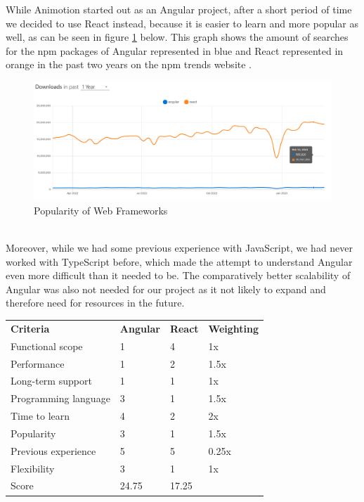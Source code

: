 While Animotion started out as an Angular project, after a short period of time we decided to use React instead, because it 
is easier to learn and more popular as well, as can be seen in figure \ref{fig:webpop} below. This graph shows the amount of 
searches for the npm packages of Angular represented in blue and React represented in orange in the past two years on
the npm trends website \cite{AngularReactPopularity}.
\\
\begin{figure}[htb]
  \centering
  \includegraphics[width=1\textwidth]{pics/WebframeworkPopularity.png}
  \caption{Popularity of Web Frameworks}
  \label{fig:webpop}
\end{figure}
\\
Moreover, while we had some previous experience with JavaScript, we had never worked with TypeScript before, which made the attempt 
to understand Angular even more difficult than it needed to be. The comparatively better scalability of Angular was also not needed
for our project as it not likely to expand and therefore need for resources in the future.
\\
\begin{table}[]
\begin{tabular}{llll}
\textbf{Criteria}    & \textbf{Angular} & \textbf{React} & \textbf{Weighting} \\
Functional scope     & 1                & 4              & 1x                 \\
Performance          & 1                & 2              & 1.5x               \\
Long-term support    & 1                & 1              & 1x                 \\
Programming language & 3                & 1              & 1.5x               \\
Time to learn        & 4                & 2              & 2x                 \\
Popularity           & 3                & 1              & 1.5x               \\
Previous experience  & 5                & 5              & 0.25x              \\
Flexibility          & 3                & 1              & 1x                 \\
Score                & 24.75            & 17.25          &                    \\
\end{tabular}
\end{table}
\\
